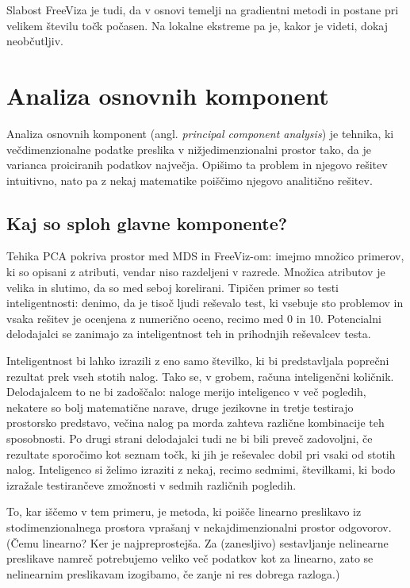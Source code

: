 Slabost FreeViza je tudi, da v osnovi temelji na gradientni metodi in postane pri velikem številu točk počasen. Na lokalne ekstreme pa je, kakor je videti, dokaj neobčutljiv.

\section{Analiza osnovnih komponent}

Analiza osnovnih komponent (angl. {\em principal component analysis}) je tehnika, ki večdimenzionalne podatke preslika v nižjedimenzionalni prostor tako, da je varianca proiciranih podatkov največja. Opišimo ta problem in njegovo rešitev intuitivno, nato pa z nekaj matematike poiščimo njegovo analitično rešitev.

\subsection{Kaj so sploh glavne komponente?}

Tehika PCA pokriva prostor med MDS in FreeViz-om: imejmo množico primerov, ki so opisani z atributi, vendar niso razdeljeni v razrede. Množica atributov je velika in slutimo, da so med seboj korelirani. Tipičen primer so testi inteligentnosti: denimo, da je tisoč ljudi reševalo test, ki vsebuje sto problemov in vsaka rešitev je ocenjena z numerično oceno, recimo med 0 in 10. Potencialni delodajalci se zanimajo za inteligentnost teh in prihodnjih reševalcev testa.

Inteligentnost bi lahko izrazili z eno samo številko, ki bi predstavljala poprečni rezultat prek vseh stotih nalog. Tako se, v grobem, računa inteligenčni količnik. Delodajalcem to ne bi zadoščalo: naloge merijo inteligenco v več pogledih, nekatere so bolj matematične narave, druge jezikovne in tretje testirajo prostorsko predstavo, večina nalog pa morda zahteva različne kombinacije teh sposobnosti. Po drugi strani delodajalci tudi ne bi bili preveč zadovoljni, če rezultate sporočimo kot seznam točk, ki jih je reševalec dobil pri vsaki od stotih nalog. Inteligenco si želimo izraziti z nekaj, recimo sedmimi, številkami, ki bodo izražale testirančeve zmožnosti v sedmih različnih pogledih.

To, kar iščemo v tem primeru, je metoda, ki poišče linearno preslikavo iz stodimenzionalnega prostora vprašanj v nekajdimenzionalni prostor odgovorov. (Čemu linearno? Ker je najpreprostejša. Za (zanesljivo) sestavljanje nelinearne preslikave namreč potrebujemo veliko več podatkov kot za linearno, zato se nelinearnim preslikavam izogibamo, če zanje ni res dobrega razloga.)

